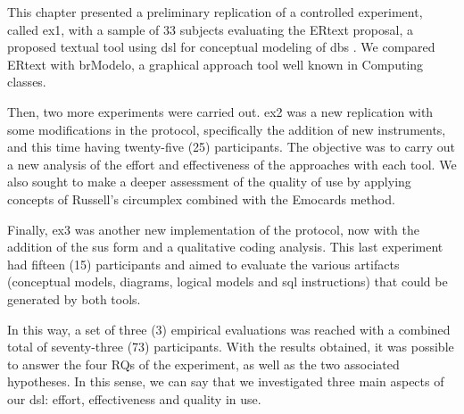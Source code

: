 This chapter presented a preliminary replication of a controlled experiment, called \ac{ex1}, with a sample of 33 subjects evaluating the ERtext proposal, a proposed textual tool using \ac{dsl} for conceptual modeling of \acp{db} .
We compared ERtext with brModelo, a graphical approach tool well known in Computing classes.

Then, two more experiments were carried out.
\ac{ex2} was a new replication with some modifications in the protocol, specifically the addition of new instruments, and this time having twenty-five (25) participants.
The objective was to carry out a new analysis of the effort and effectiveness of the approaches with each tool.
We also sought to make a deeper assessment of the quality of use by applying concepts of Russell's circumplex combined with the Emocards method.

Finally, \ac{ex3} was another new implementation of the protocol, now with the addition of the \ac{sus} form and a qualitative coding analysis.
This last experiment had fifteen (15) participants and aimed to evaluate the various artifacts (conceptual models, diagrams, logical models and \ac{sql} instructions) that could be generated by both tools.

In this way, a set of three (3) empirical evaluations was reached with a combined total of seventy-three (73) participants.
With the results obtained, it was possible to answer the four RQs of the experiment, as well as the two associated hypotheses.
In this sense, we can say that we investigated three main aspects of our \ac{dsl}: effort, effectiveness and quality in use.

